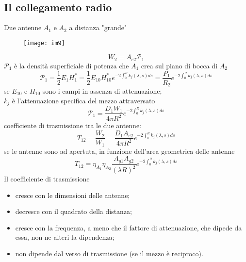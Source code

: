 \documentclass[a4paper]{article}
\begin{document}
\subsection*{Il collegamento radio}
Due antenne $A_1$ e $A_2$ a distanza "grande"
\begin{figure}[ht] 
\centering
\texttt{[image: im9]}
\end{figure}
\begin{equation*}
W_2=A_{e2}\mathcal{P}_1
\end{equation*}
$\mathcal{P}_1$ è la densità superficiale di potenza che $A_1$ crea sul piano di bocca di $A_2$
\begin{equation*}
\mathcal{P}_1=\frac{1}{2}E_1H_1^*=\frac{1}{2}E_{10}H_{10}^*e^{-2\int_0^Rk_j(\lambda,s)ds}=\frac{P_1}{R_2}e^{-2\int_0^Rk_j(\lambda,s)ds}
\end{equation*}
se $E_{10}$ e $H_{10}$ sono i campi in assenza di attenuazione;\\
$k_j$ è l'attenuazione specifica del mezzo attraversato
\begin{equation*}
\mathcal{P}_1=\frac{D_1W_1}{4\pi R^2}e^{-2\int_0^Rk_j(\lambda,s)ds}
\end{equation*}
coefficiente di trasmissione tra le due antenne:
\begin{equation*}
T_{12}=\frac{W_2}{W_1}=\frac{D_1A_{e2}}{4\pi R^2}e^{-2\int_0^Rk_j(\lambda,s)ds}
\end{equation*}
se le antenne sono ad apertuta, in funzione dell'area geometrica delle antenne
\begin{equation*}
T_{12}=\eta_{A_1}\eta_{A_2}\frac{A_{g1}A_{g2}}{(\lambda R)^2}e^{-2\int_0^Rk_j(\lambda,s)ds}
\end{equation*}
Il coefficiente di trasmissione
\begin{itemize}
\item cresce con le dimensioni delle antenne;
\item decresce con il quadrato della distanza;
\item cresce con la frequenza, a meno che il fattore di attenuazione, che dipede da essa, non ne alteri la dipendenza;
\item non dipende dal verso di trasmissione (se il mezzo è reciproco). 
\end{itemize}
\end{document}
